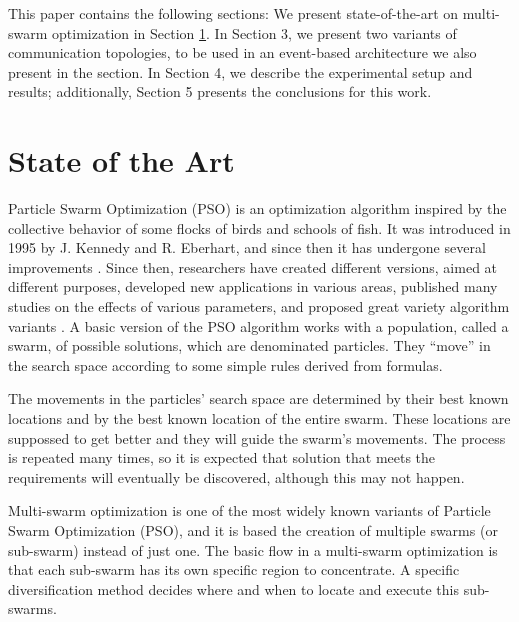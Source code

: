 \documentclass[runningheads]{llncs}
\begin{document}
This paper contains the following sections: We present
state-of-the-art on multi-swarm optimization in Section
\ref{sec:soa}. In Section 3, we present two variants of communication
topologies, to be used in an event-based architecture we also present
in the section. In Section 4, we describe the experimental setup and
results; additionally, Section 5 presents the conclusions for this
work.

\section{State of the Art}
\label{sec:soa}

Particle Swarm Optimization (PSO) is an optimization algorithm
inspired by the collective behavior of some flocks of birds and schools of fish. It was introduced in 1995 by  J. Kennedy and
R. Eberhart, and since then it has undergone several improvements \cite{b1}. %
Since then, researchers have created different versions, aimed at different
purposes, developed new applications in various areas, published many
studies on the effects of various parameters, and proposed great
variety algorithm variants \cite{b2}. %
A basic version of the PSO algorithm
works with a population, called a swarm, of possible solutions, which
are denominated particles. They ``move'' in the search space according to
some simple rules derived from formulas. %

The movements in the particles' search space are
determined by their best known locations and by the best known location
of the entire swarm. %
These locations are suppossed to get better and they will
guide the swarm's movements. The process is repeated many times, so it
is expected that solution that meets the requirements will eventually be
discovered, although this may not happen\cite{b3}. %


Multi-swarm optimization is one of the most widely known variants of Particle Swarm Optimization
(PSO), and it is based the creation of multiple swarms (or sub-swarm)
instead of just one. %
The basic flow in
a multi-swarm optimization is that each sub-swarm has its own specific region to concentrate. A specific diversification method decides where and
when to locate and execute this sub-swarms. %
\end{document}

